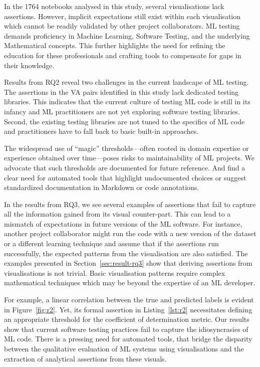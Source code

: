 \documentclass[conference]{IEEEtran}
\begin{document}
In the 1764 notebooks analysed in this study, several visualisations lack assertions. However, implicit expectations still exist within each visualisation which cannot be readily validated by other project collaborators. ML testing demands proficiency in Machine Learning, Software Testing, and the underlying Mathematical concepts. This further highlights the need for refining the education for these professionals and crafting tools to compensate for gaps in their knowledge.

Results from RQ2 reveal two challenges in the current landscape of ML testing. The assertions in the VA pairs identified in this study lack dedicated testing libraries. This indicates that the current culture of testing ML code is still in its infancy and ML practitioners are not yet exploring software testing libraries. Second, the existing testing libraries are not tuned to the specifics of ML code and practitioners have to fall back to basic built-in approaches.

The widespread use of ``magic'' thresholds---often rooted in domain expertise or experience obtained over time---poses risks to maintainability of ML projects. We advocate that such thresholds are documented for future reference. And find a clear need for automated tools that highlight undocumented choices or suggest standardized documentation in Markdown or code annotations.

In the results from RQ3, we see several examples of assertions that fail to capture all the information gained from its visual counter-part. This can lead to a mismatch of expectations in future versions of the ML software. For instance, another project collaborator might run the code with a new version of the dataset or a different learning technique and assume that if the assertions run successfully, the expected patterns from the visualisation are also satisfied. The examples presented in Section~\ref{sec:result-rq3} show that deriving assertions from visualisations is not trivial. Basic visualisation patterns require complex mathematical techniques which may be beyond the expertise of an ML developer.

For example, a linear correlation between the true and predicted labels is evident in Figure~\ref{fig:r2}. Yet, its formal assertion in Listing~\ref{lst:r2} necessitates defining an appropriate threshold for the coefficient of determination metric. Our results show that current software testing practices fail to capture the idiosyncrasies of ML code. There is a pressing need for automated tools, that bridge the disparity between the qualitative evaluation of ML systems using visualisations and the extraction of analytical assertions from these visuals.
\end{document}

